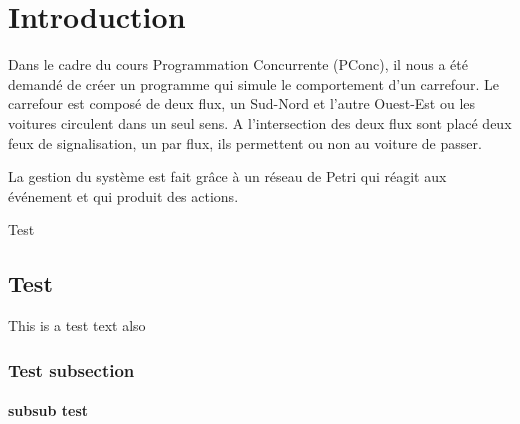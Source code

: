 \documentclass[11pt,a4paper]{memoir}
\begin{document}
\clearpage


\listoftables  %

\clearpage


\chapter{Introduction}

Dans le cadre du cours Programmation Concurrente (PConc), il nous a été demandé de créer un programme qui simule le comportement d'un carrefour. Le carrefour est composé de deux flux, un Sud-Nord et l'autre Ouest-Est ou les voitures circulent dans un seul sens. A l'intersection des deux flux sont placé deux feux de signalisation, un par flux, ils permettent ou non au voiture de passer.\par
La gestion du système est fait grâce à un réseau de Petri qui réagit aux événement et qui produit des actions.


Test \cite{Reference1}

\section{Test}

This is a test text also

\subsection{Test subsection}

\subsubsection{subsub test}






\end{document}
